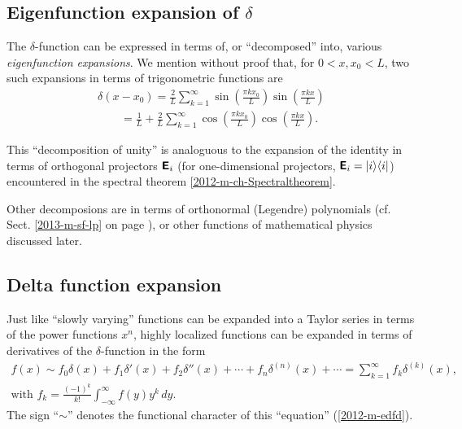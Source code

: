 \subsection{Eigenfunction expansion of $\delta$}
\label{2012-m-efed1}

The  $\delta$-function can be expressed  in terms of, or ``decomposed'' into, various
{\em eigenfunction expansions}.
We mention without proof
\cite{duffy2001} that, for $0< x,x_0 <L$,
two such expansions in terms of trigonometric functions are
\begin{equation}
\begin{split}
\delta (x-x_0) =
\frac{2}{L}
\sum_{k=1}^\infty
\sin \left( \frac{\pi k x_0}{L}\right)
\sin \left( \frac{\pi k x}{L}\right)\\
\qquad  =
\frac{1}{L}
+
\frac{2}{L}
\sum_{k=1}^\infty
\cos \left( \frac{\pi k x_0}{L}\right)
\cos \left( \frac{\pi k x}{L}\right).
\end{split}
\label{2012-m-efed}
\end{equation}

This ``decomposition of unity'' is analoguous to the expansion of the identity in terms of orthogonal projectors
$\textsf{\textbf{E}}_i$  (for one-dimensional projectors, $\textsf{\textbf{E}}_i=\vert i\rangle \langle i \vert $)
encountered in the spectral theorem \ref{2012-m-ch-Spectraltheorem}.

Other decomposions are in terms of orthonormal (Legendre) polynomials (cf. Sect. \ref{2013-m-sf-lp} on page \pageref{2013-m-sf-lp}),
or other functions of mathematical physics discussed later.

\subsection{Delta function expansion}
\label{2012-m-dfex}

Just like ``slowly varying'' functions can be expanded into a Taylor series in terms of the power functions $x^n$,
highly localized functions can be expanded in terms of derivatives of the $\delta$-function in the form \cite{lindell:438}
\begin{equation}
\begin{split}
f(x) \sim
f_0 \delta (x) +
f_1 \delta' (x) +
f_2 \delta'' (x) + \cdots +f_n \delta^{(n)}(x) + \cdots =\sum_{k=1}^\infty f_k \delta^{(k)}(x),\\
\textrm{with } f_k= \frac{(-1)^k}{k!} \int_{-\infty}^\infty f(y) y^k \, dy
.
\end{split}
\label{2012-m-edfd}
\end{equation}
The sign ``$\sim$'' denotes the functional character of this ``equation'' (\ref{2012-m-edfd}).

